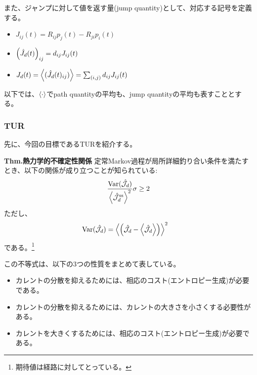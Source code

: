 \documentclass[a4paper,11pt]{jsarticle}
\numberwithin{equation}{section}
\begin{document}
また、ジャンプに対して値を返す量(jump quantity)として、対応する記号を定義する。
\begin{itemize}
    \item ${J}_{ij}(t) = R_{ij}p_j(t) - R_{ji}p_i(t)$
    \item $\qty(\hat{J}_{d}(t))_{ij} = d_{ij} {J}_{ij}(t)$
    \item $J_{d}(t) = \ev{(\hat{J}_{d}(t)_{ij})} = \sum_{(i,j)} d_{ij} {J}_{ij}(t)$
\end{itemize}

以下では、$\ev{\cdot}$でpath quantityの平均も、jump quantityの平均も表すこととする。\\

\subsubsection{TUR}
先に、今回の目標であるTURを紹介する。
\begin{itembox}[l]{\textbf{Thm.熱力学的不確定性関係}}
    定常Markov過程が局所詳細釣り合い条件を満たすとき、以下の関係が成り立つことが知られている:
    \begin{align}
        \frac{\text{Var}(\hat{\mathcal{J}}_d)}{\ev{\hat{\mathcal{J}}_d^{\text{ss}}}^2} \sigma \geq 2
    \end{align}
    ただし、
    \begin{align}
        \text{Var}(\hat{\mathcal{J}}_d) &= \ev{\qty(\hat{\mathcal{J}}_d -\ev{\hat{\mathcal{J}_d}})}^2
    \end{align}
    である。\footnote{期待値は経路に対してとっている。}
\end{itembox}
この不等式は、以下の3つの性質をまとめて表している。
\begin{itemize}
    \item カレントの分散を抑えるためには、相応のコスト(エントロピー生成)が必要である。
    \item カレントの分散を抑えるためには、カレントの大きさを小さくする必要性がある。
    \item カレントを大きくするためには、相応のコスト(エントロピー生成)が必要である。
\end{itemize}

\noindent
\end{document}
